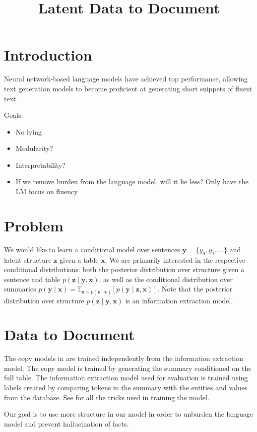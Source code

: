 \documentclass{article}
\title{Latent Data to Document}
\newcommand\Es[2]{\mathbb{E}_{#1}\left[#2\right]}
\newcommand{\bx}{\mathbf{x}}
\newcommand{\by}{\mathbf{y}}
\newcommand{\bz}{\mathbf{z}}
\begin{document}
\maketitle

\section{Introduction}
Neural network-based language models have achieved top performance,
allowing text generation models to become proficient at
generating short snippets of fluent text.

Goals:
\begin{itemize}
\item No lying
\item Modularity?
\item Interpretability?
\item If we remove burden from the language model, will it lie less?
Only have the LM focus on fluency
\end{itemize}

\section{Problem}
We would like to learn a conditional model
over sentences $\by = \{y_0, y_1, \ldots\}$ and latent structure $\bz$
given a table $\bx$.
We are primarily interested in the respective conditional distributions:
both the posterior distribution over structure given a sentence and table $p(\bz\mid\by,\bx)$,
as well as the conditional distribution over summaries
$p(\by\mid\bx)=\Es{\bz\sim p(\bz\mid\bx)}{p(\by\mid\bz,\bx)}$.
Note that the posterior distribution over structure $p(\bz\mid\by,\bx)$
is an information extraction model.

\section{Data to Document}
The copy models in \citet{wiseman2017d2t} are trained independently from the information extraction model. 
The copy model is trained by generating the summary conditioned on the full table.
The information extraction model used for evaluation is trained using labels
created by comparing tokens in the summary with the entities and values from the database.
See \citet{wiseman2017d2t} for all the tricks used in training the model.

Our goal is to use more structure in our model in order to unburden the language model
and prevent hallucination of facts.
\end{document}
